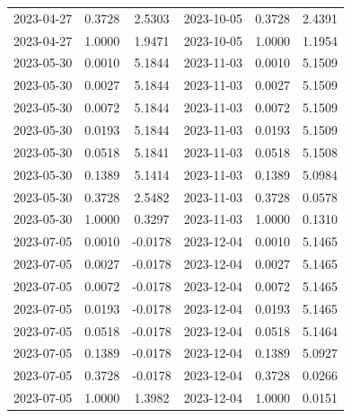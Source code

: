 \begin{footnotesize}
\begin{longtable}{lcc|lcc}
2023-04-27 & 0.3728 & 2.5303 & 2023-10-05 & 0.3728 & 2.4391 \\
2023-04-27 & 1.0000 & 1.9471 & 2023-10-05 & 1.0000 & 1.1954 \\
2023-05-30 & 0.0010 & 5.1844 & 2023-11-03 & 0.0010 & 5.1509 \\
2023-05-30 & 0.0027 & 5.1844 & 2023-11-03 & 0.0027 & 5.1509 \\
2023-05-30 & 0.0072 & 5.1844 & 2023-11-03 & 0.0072 & 5.1509 \\
2023-05-30 & 0.0193 & 5.1844 & 2023-11-03 & 0.0193 & 5.1509 \\
2023-05-30 & 0.0518 & 5.1841 & 2023-11-03 & 0.0518 & 5.1508 \\
2023-05-30 & 0.1389 & 5.1414 & 2023-11-03 & 0.1389 & 5.0984 \\
2023-05-30 & 0.3728 & 2.5482 & 2023-11-03 & 0.3728 & 0.0578 \\
2023-05-30 & 1.0000 & 0.3297 & 2023-11-03 & 1.0000 & 0.1310 \\
2023-07-05 & 0.0010 & -0.0178 & 2023-12-04 & 0.0010 & 5.1465 \\
2023-07-05 & 0.0027 & -0.0178 & 2023-12-04 & 0.0027 & 5.1465 \\
2023-07-05 & 0.0072 & -0.0178 & 2023-12-04 & 0.0072 & 5.1465 \\
2023-07-05 & 0.0193 & -0.0178 & 2023-12-04 & 0.0193 & 5.1465 \\
2023-07-05 & 0.0518 & -0.0178 & 2023-12-04 & 0.0518 & 5.1464 \\
2023-07-05 & 0.1389 & -0.0178 & 2023-12-04 & 0.1389 & 5.0927 \\
2023-07-05 & 0.3728 & -0.0178 & 2023-12-04 & 0.3728 & 0.0266 \\
2023-07-05 & 1.0000 & 1.3982 & 2023-12-04 & 1.0000 & 0.0151 \\
\end{longtable}
\end{footnotesize}
